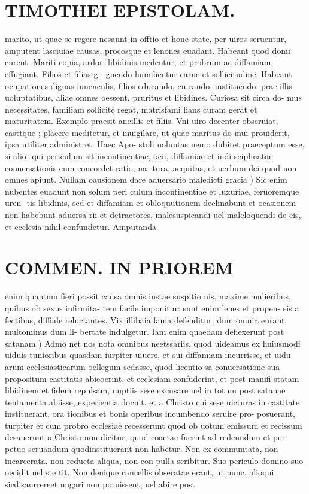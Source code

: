 \documentclass{article}
\begin{document}
\begin{pages}
\section*{TIMOTHEI EPISTOLAM. }
\marginpar{[ p.133 ]}\pstart marito, ut quae se regere nesaunt in offtio et hone state, per uiros seruentur, amputent lasciuiae causas, procosque et lenones euadant. Habeant quod domi curent. Mariti copia, ardori libidinis medentur, et probrum ac diffamiam effugiant. Filios et filias gi- gnendo humilientur carne et sollicitudine. Habeant ocupationes dignas iuuenculis, filios educando, cu rando, instituendo: prae illis uoluptatibus, aliae omnes oessent, pruritus et libidines. Curiosa sit circa do- mus necessitates, familiam sollicite regat, matrisfami lians curam gerat et maturitatem. Exemplo praesit ancillis et filiis. Vni uiro decenter obseruiat, casttque ; placere meditetur, et inuigilare, ut quae maritus do mui prouiderit, ipsa utiliter administret. Haec Apo- stoli uoluntas nemo dubitet praeceptum esse, si alio- qui periculum sit incontinentiae, ocii, diffamiae et indi sciplinatae conuersationis cum concordet ratio, na- tura, aequitas, et uerbum dei quod non omnes apiunt.  \pend\pstart Nullam oausionem dare aduersario maledicti gracia ) Sic enim nubentes euadunt non solum peri culum incontinentiae et luxuriae, feruoremque uren- tis libidinis, sed et diffamiam et obloquutionem declinabunt et ocasionem non habebunt aduersa rii et detractores, malesuspicandi uel maleloquendi de eis, et ecclesia nihil confundetur. Amputanda  \pend
\section*{COMMEN. IN PRIOREM }
\marginpar{[ p.134 ]}\pstart enim quantum fieri possit causa omnis iustae suspitio nis, maxime mulieribus, quibus ob sexus infirmita- tem facile imponitur: sunt enim leues et propen- sis a fectibus, diffiale reluctantes. Vix illibaia fama defenditur, dum omnia eurant, multominus dum li- bertate indulgetur.  \pend\pstart Iam enim quaedam deflexerunt post satanam ) Admo net nos nota omnibus neetssariis, quod uideamus ex huiusmodi uiduis tunioribus quasdam iurpiter uiuere, et sui diffamiam incurrisse, et uidu arum ecclesiasticarum oellegum sedasse, quod licentio sa conuersatione sua propositum castitatis abieoerint, et ecclesiam confuderint, et post manifi statam libidinem et fidem repulsam, nuptiis sese excusare uel in totum post satanae tentamenta abiisse, experientia docuit, et a Christo cui sese uicturas in castitate instituerant, ora tionibus et bonis operibus incumbendo seruire pro- posuerant, turpiter et cum probro ecclesiae recesserunt quod ob uotum emissum et recissum desauerunt a Christo non dicitur, quod coactae fuerint ad redeundum et per petuo seruandum quodinstituerant non habetur. Non ex communtata, non incarcerata, non reducta aliqua, non con pulla scribitur. Suo periculo domino suo oecidit uel ste tit. Non denique cancellis obseratae erant, ut nunc, alioqui sicdisaurrereet nugari non potuissent, uel abire post  \pend

\end{pages}
\end{document}
